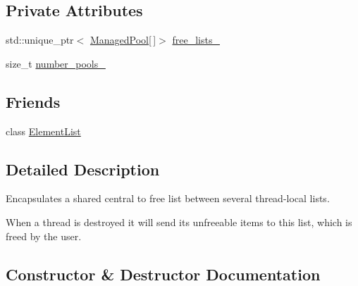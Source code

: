 \subsection*{Private Attributes}
\begin{DoxyCompactItemize}
\item 
std\+::unique\+\_\+ptr$<$ \hyperlink{structtervel_1_1util_1_1memory_1_1hp_1_1_list_manager_1_1_managed_pool}{Managed\+Pool}\mbox{[}$\,$\mbox{]}$>$ \hyperlink{classtervel_1_1util_1_1memory_1_1hp_1_1_list_manager_ab69b3baf1e6e618ae90c39694ea0baa7}{free\+\_\+lists\+\_\+}
\item 
size\+\_\+t \hyperlink{classtervel_1_1util_1_1memory_1_1hp_1_1_list_manager_a5db6bf76022092febdad37d9d6db73e4}{number\+\_\+pools\+\_\+}
\end{DoxyCompactItemize}
\subsection*{Friends}
\begin{DoxyCompactItemize}
\item 
class \hyperlink{classtervel_1_1util_1_1memory_1_1hp_1_1_list_manager_a9b2179409b88ca63c8a1eea5b93a82a9}{Element\+List}
\end{DoxyCompactItemize}


\subsection{Detailed Description}
Encapsulates a shared central \textquotesingle{}to free list\textquotesingle{} between several thread-\/local lists. 

When a thread is destroyed it will send its unfreeable items to this list, which is freed by the user. 

\subsection{Constructor \& Destructor Documentation}
\hypertarget{classtervel_1_1util_1_1memory_1_1hp_1_1_list_manager_a4b3bf525fc6328f81d4696e4357bf507}{}
